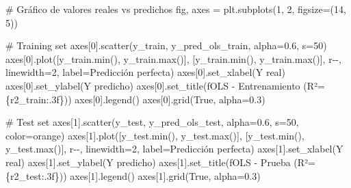 \documentclass[
  doc,
  floatsintext,
  longtable,
  a4paper,
  nolmodern,
  notxfonts,
  notimes,
  12pt,
  colorlinks=true,linkcolor=blue,citecolor=blue,urlcolor=blue]{apa7}
\newenvironment{Shaded}{\begin{snugshade}}{\end{snugshade}}
\newcommand{\BuiltInTok}[1]{\textcolor[rgb]{0.00,0.23,0.31}{#1}}
\newcommand{\CommentTok}[1]{\textcolor[rgb]{0.37,0.37,0.37}{#1}}
\newcommand{\DecValTok}[1]{\textcolor[rgb]{0.68,0.00,0.00}{#1}}
\newcommand{\FloatTok}[1]{\textcolor[rgb]{0.68,0.00,0.00}{#1}}
\newcommand{\NormalTok}[1]{\textcolor[rgb]{0.00,0.23,0.31}{#1}}
\newcommand{\OperatorTok}[1]{\textcolor[rgb]{0.37,0.37,0.37}{#1}}
\newcommand{\SpecialCharTok}[1]{\textcolor[rgb]{0.37,0.37,0.37}{#1}}
\newcommand{\SpecialStringTok}[1]{\textcolor[rgb]{0.13,0.47,0.30}{#1}}
\newcommand{\StringTok}[1]{\textcolor[rgb]{0.13,0.47,0.30}{#1}}
\newcommand{\VariableTok}[1]{\textcolor[rgb]{0.07,0.07,0.07}{#1}}
\begin{document}
\begin{Shaded}
\begin{Highlighting}[]
\CommentTok{\# Gráfico de valores reales vs predichos}
\NormalTok{fig, axes }\OperatorTok{=}\NormalTok{ plt.subplots(}\DecValTok{1}\NormalTok{, }\DecValTok{2}\NormalTok{, figsize}\OperatorTok{=}\NormalTok{(}\DecValTok{14}\NormalTok{, }\DecValTok{5}\NormalTok{))}

\CommentTok{\# Training set}
\NormalTok{axes[}\DecValTok{0}\NormalTok{].scatter(y\_train, y\_pred\_ols\_train, alpha}\OperatorTok{=}\FloatTok{0.6}\NormalTok{, s}\OperatorTok{=}\DecValTok{50}\NormalTok{)}
\NormalTok{axes[}\DecValTok{0}\NormalTok{].plot([y\_train.}\BuiltInTok{min}\NormalTok{(), y\_train.}\BuiltInTok{max}\NormalTok{()], }
\NormalTok{             [y\_train.}\BuiltInTok{min}\NormalTok{(), y\_train.}\BuiltInTok{max}\NormalTok{()], }
             \StringTok{\textquotesingle{}r{-}{-}\textquotesingle{}}\NormalTok{, linewidth}\OperatorTok{=}\DecValTok{2}\NormalTok{, label}\OperatorTok{=}\StringTok{\textquotesingle{}Predicción perfecta\textquotesingle{}}\NormalTok{)}
\NormalTok{axes[}\DecValTok{0}\NormalTok{].set\_xlabel(}\StringTok{\textquotesingle{}Y real\textquotesingle{}}\NormalTok{)}
\NormalTok{axes[}\DecValTok{0}\NormalTok{].set\_ylabel(}\StringTok{\textquotesingle{}Y predicho\textquotesingle{}}\NormalTok{)}
\NormalTok{axes[}\DecValTok{0}\NormalTok{].set\_title(}\SpecialStringTok{f\textquotesingle{}OLS {-} Entrenamiento (R²=}\SpecialCharTok{\{}\NormalTok{r2\_train}\SpecialCharTok{:.3f\}}\SpecialStringTok{)\textquotesingle{}}\NormalTok{)}
\NormalTok{axes[}\DecValTok{0}\NormalTok{].legend()}
\NormalTok{axes[}\DecValTok{0}\NormalTok{].grid(}\VariableTok{True}\NormalTok{, alpha}\OperatorTok{=}\FloatTok{0.3}\NormalTok{)}

\CommentTok{\# Test set}
\NormalTok{axes[}\DecValTok{1}\NormalTok{].scatter(y\_test, y\_pred\_ols\_test, alpha}\OperatorTok{=}\FloatTok{0.6}\NormalTok{, s}\OperatorTok{=}\DecValTok{50}\NormalTok{, color}\OperatorTok{=}\StringTok{\textquotesingle{}orange\textquotesingle{}}\NormalTok{)}
\NormalTok{axes[}\DecValTok{1}\NormalTok{].plot([y\_test.}\BuiltInTok{min}\NormalTok{(), y\_test.}\BuiltInTok{max}\NormalTok{()], }
\NormalTok{             [y\_test.}\BuiltInTok{min}\NormalTok{(), y\_test.}\BuiltInTok{max}\NormalTok{()], }
             \StringTok{\textquotesingle{}r{-}{-}\textquotesingle{}}\NormalTok{, linewidth}\OperatorTok{=}\DecValTok{2}\NormalTok{, label}\OperatorTok{=}\StringTok{\textquotesingle{}Predicción perfecta\textquotesingle{}}\NormalTok{)}
\NormalTok{axes[}\DecValTok{1}\NormalTok{].set\_xlabel(}\StringTok{\textquotesingle{}Y real\textquotesingle{}}\NormalTok{)}
\NormalTok{axes[}\DecValTok{1}\NormalTok{].set\_ylabel(}\StringTok{\textquotesingle{}Y predicho\textquotesingle{}}\NormalTok{)}
\NormalTok{axes[}\DecValTok{1}\NormalTok{].set\_title(}\SpecialStringTok{f\textquotesingle{}OLS {-} Prueba (R²=}\SpecialCharTok{\{}\NormalTok{r2\_test}\SpecialCharTok{:.3f\}}\SpecialStringTok{)\textquotesingle{}}\NormalTok{)}
\NormalTok{axes[}\DecValTok{1}\NormalTok{].legend()}
\NormalTok{axes[}\DecValTok{1}\NormalTok{].grid(}\VariableTok{True}\NormalTok{, alpha}\OperatorTok{=}\FloatTok{0.3}\NormalTok{)}


\end{Highlighting}
\end{Shaded}
\end{document}
